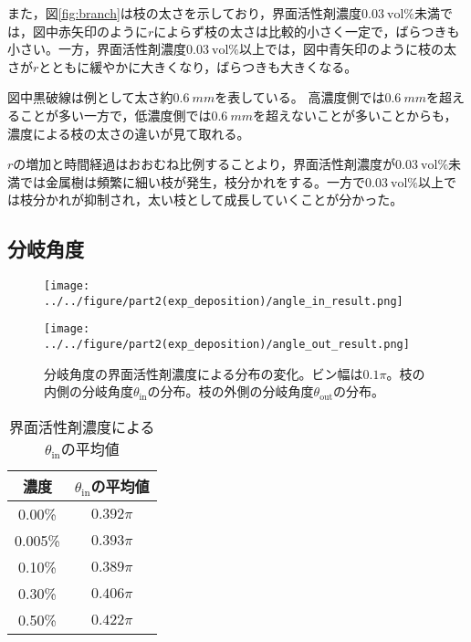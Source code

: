 \documentclass[autodetect-engine,dvi=dvipdfmx,a4paper,ja=standard,oneside,openany,11pt]{bxjsbook}
\begin{document}
また，図\ref{fig:branch}は枝の太さを示しており，界面活性剤濃度$\SI{0.03}{\mathrm{vol}\%}$未満では，図中赤矢印のように$r$によらず枝の太さは比較的小さく一定で，ばらつきも小さい。一方，界面活性剤濃度$\SI{0.03}{\mathrm{vol}\%}$以上では，図中青矢印のように枝の太さが$r$とともに緩やかに大きくなり，ばらつきも大きくなる。

図中黒破線は例として太さ約$\SI{0.6}{mm}$を表している。
高濃度側では$\SI{0.6}{mm}$を超えることが多い一方で，低濃度側では$\SI{0.6}{mm}$を超えないことが多いことからも，濃度による枝の太さの違いが見て取れる。

$r$の増加と時間経過はおおむね比例することより，界面活性剤濃度が$\SI{0.03}{\mathrm{vol}\%}$未満では金属樹は頻繁に細い枝が発生，枝分かれをする。一方で$\SI{0.03}{\mathrm{vol}\%}$以上では枝分かれが抑制され，太い枝として成長していくことが分かった。

\subsection{分岐角度}

\begin{figure}[htbp]
  \begin{minipage}
    {0.5\textwidth}
    \subcaption{}
    \centering
    \texttt{[image: ../../figure/part2(exp\_deposition)/angle\_in\_result.png]}
    \label{fig:angle_in}
  \end{minipage}
  \begin{minipage}
    {0.45\textwidth}
    \subcaption{}
    \centering
    \texttt{[image: ../../figure/part2(exp\_deposition)/angle\_out\_result.png]}
    \label{fig:angle_out}
  \end{minipage}
  \caption{分岐角度の界面活性剤濃度による分布の変化。ビン幅は$0.1\pi$。枝の内側の分岐角度$\theta_{\mathrm{in}}$の分布。枝の外側の分岐角度$\theta_{\mathrm{out}}$の分布。}
  \label{fig:angle}
\end{figure}

\begin{table}
  \centering
  \caption{界面活性剤濃度による$\theta_{\mathrm{in}}$の平均値}
  \begin{tabular}{|c|c|}
    \hline
    濃度      & $\theta_{\mathrm{in}}$の平均値 \\
    \hline\hline
    0.00\%  & $0.392\pi$                 \\ \hline
    0.005\% & $0.393\pi$                 \\ \hline
    0.10\%  & $0.389\pi$                 \\ \hline
    0.30\%  & $0.406\pi$                 \\ \hline
    0.50\%  & $0.422\pi$                 \\
    \hline
  \end{tabular}
  \label{tab:angle_average}
\end{table}
\end{document}
